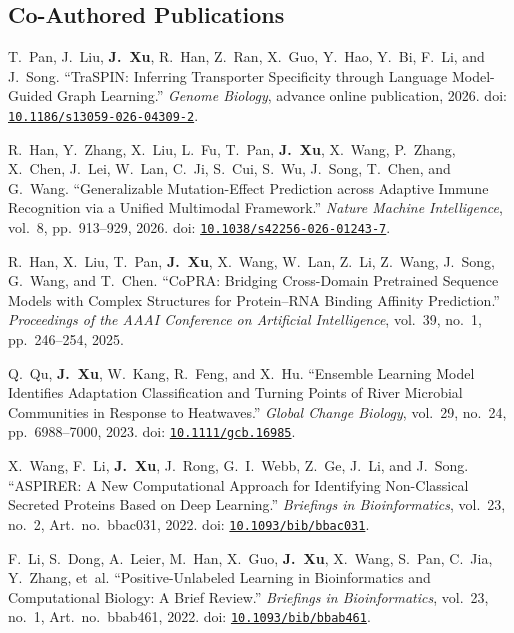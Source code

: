 \documentclass[10pt,a4paper]{article}
\begin{document}
\subsection*{Co-Authored Publications}
\begin{enumerate}[label={[\arabic*]}, before={\interlinepenalty=10000}]

\item
T.~Pan, J.~Liu, \textbf{J.~Xu}, R.~Han, Z.~Ran, X.~Guo, Y.~Hao, Y.~Bi, F.~Li, and J.~Song.
``TraSPIN: Inferring Transporter Specificity through Language Model-Guided Graph Learning.''
\textit{Genome Biology}, advance online publication, 2026.
doi: \href{https://doi.org/10.1186/s13059-026-04309-2}{\nolinkurl{10.1186/s13059-026-04309-2}}.

\item
R.~Han, Y.~Zhang, X.~Liu, L.~Fu, T.~Pan, \textbf{J.~Xu}, X.~Wang, P.~Zhang, X.~Chen, J.~Lei, W.~Lan, C.~Ji, S.~Cui, S.~Wu, J.~Song, T.~Chen, and G.~Wang.
``Generalizable Mutation-Effect Prediction across Adaptive Immune Recognition via a Unified Multimodal Framework.''
\textit{Nature Machine Intelligence}, vol.~8, pp.~913--929, 2026.
doi: \href{https://doi.org/10.1038/s42256-026-01243-7}{\nolinkurl{10.1038/s42256-026-01243-7}}.

\item
R.~Han, X.~Liu, T.~Pan, \textbf{J.~Xu}, X.~Wang, W.~Lan, Z.~Li, Z.~Wang, J.~Song, G.~Wang, and T.~Chen.
``CoPRA: Bridging Cross-Domain Pretrained Sequence Models with Complex Structures for Protein--RNA Binding Affinity Prediction.''
\textit{Proceedings of the AAAI Conference on Artificial Intelligence}, vol.~39, no.~1, pp.~246--254, 2025.

\item
Q.~Qu, \textbf{J.~Xu}, W.~Kang, R.~Feng, and X.~Hu.
``Ensemble Learning Model Identifies Adaptation Classification and Turning Points of River Microbial Communities in Response to Heatwaves.''
\textit{Global Change Biology}, vol.~29, no.~24, pp.~6988--7000, 2023.
doi: \href{https://doi.org/10.1111/gcb.16985}{\nolinkurl{10.1111/gcb.16985}}.

\item
X.~Wang, F.~Li, \textbf{J.~Xu}, J.~Rong, G.~I.~Webb, Z.~Ge, J.~Li, and J.~Song.
``ASPIRER: A New Computational Approach for Identifying Non-Classical Secreted Proteins Based on Deep Learning.''
\textit{Briefings in Bioinformatics}, vol.~23, no.~2, Art.~no.~bbac031, 2022.
doi: \href{https://doi.org/10.1093/bib/bbac031}{\nolinkurl{10.1093/bib/bbac031}}.

\item
F.~Li, S.~Dong, A.~Leier, M.~Han, X.~Guo, \textbf{J.~Xu}, X.~Wang, S.~Pan, C.~Jia, Y.~Zhang, et~al.
``Positive-Unlabeled Learning in Bioinformatics and Computational Biology: A Brief Review.''
\textit{Briefings in Bioinformatics}, vol.~23, no.~1, Art.~no.~bbab461, 2022.
doi: \href{https://doi.org/10.1093/bib/bbab461}{\nolinkurl{10.1093/bib/bbab461}}.


\end{enumerate}
\end{document}
